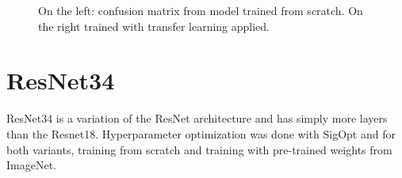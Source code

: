 \begin{figure}[h]
\centering
{}
\caption{On the left: confusion matrix from model trained from scratch. On the right trained with transfer learning applied.}
\label{fig:resnet18-cm}
\end{figure}
















\section{ResNet34}

ResNet34 is a variation of the ResNet architecture and has simply more layers than the Resnet18. Hyperparameter optimization was done with SigOpt and for both variants, training from scratch and training with pre-trained weights from ImageNet.


